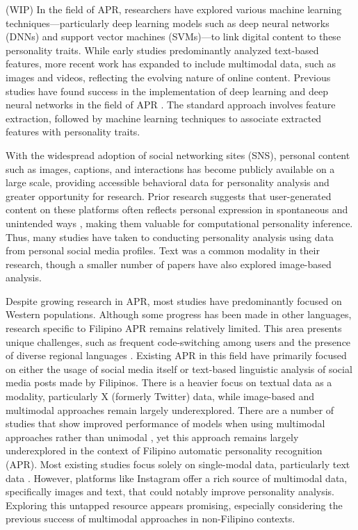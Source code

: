 (WIP) In the field of APR, researchers have explored various machine learning techniques—particularly deep learning models such as deep neural networks (DNNs) and support vector machines (SVMs)—to link digital content to these personality traits. While early studies predominantly analyzed text-based features, more recent work has expanded to include multimodal data, such as images and videos, reflecting the evolving nature of online content. Previous studies have found success in the implementation of deep learning and deep neural networks in the field of APR \citep{Zhao2022}. The standard approach involves feature extraction, followed by machine learning techniques to associate extracted features with personality traits. 

With the widespread adoption of social networking sites (SNS), personal content such as images, captions, and interactions has become publicly available on a large scale, providing accessible behavioral data for personality analysis and greater opportunity for research. Prior research suggests that user-generated content on these platforms often reflects personal expression in spontaneous and unintended ways \citep{Vinciarelli2014}, making them valuable for computational personality inference. Thus, many studies have taken to conducting personality analysis using data from personal social media profiles. Text was a common modality in their research, though a smaller number of papers have also explored image-based analysis. 

Despite growing research in APR, most studies have predominantly focused on Western populations. Although some progress has been made in other languages, research specific to Filipino APR remains relatively limited. This area presents unique challenges, such as frequent code-switching among users and the presence of diverse regional languages \citep{tighe_acorda_2022}. Existing APR in this field have primarily focused on either the usage of social media itself or text-based linguistic analysis of social media posts made by Filipinos. There is a heavier focus on textual data as a modality, particularly X (formerly Twitter) data, while image-based and multimodal approaches remain largely underexplored. There are a number of studies that show improved performance of models when using multimodal approaches rather than unimodal \citep{Christian2021}, yet this approach remains largely underexplored in the context of Filipino automatic personality recognition (APR). Most existing studies focus solely on single-modal data, particularly text data  \citep{Mehta2020}. However, platforms like Instagram offer a rich source of multimodal data, specifically images and text, that could notably improve personality analysis. Exploring this untapped resource appears promising, especially considering the previous success of multimodal approaches in non-Filipino contexts.

